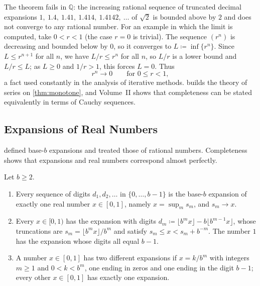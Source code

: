 The theorem fails in $\mathbb Q$: the increasing rational sequence of truncated decimal expansions $1,\ 1.4,\ 1.41,\ 1.414,\ 1.4142,\ \ldots$ of $\sqrt2$ is bounded above by $2$ and does not converge to any rational number. For an example in which the limit is computed, take $0<r<1$ (the case $r=0$ is trivial). The sequence $(r^n)$ is decreasing and bounded below by $0$, so it converges to $L\coloneqq\inf\{r^n\}$. Since $L\le r^{n+1}$ for all $n$, we have $L/r\le r^n$ for all $n$, so $L/r$ is a lower bound and $L/r\le L$; as $L\ge0$ and $1/r>1$, this forces $L=0$. Thus
\begin{equation}
r^n\to0\qquad\text{for }0\le r<1,
\label{eq:rn-zero}
\end{equation}
a fact used constantly in the analysis of iterative methods.  builds the theory of series on \cref{thm:monotone}, and Volume~II shows that completeness can be stated equivalently in terms of Cauchy sequences.

\subsection{Expansions of Real Numbers}

 defined base-$b$ expansions and treated those of rational numbers. Completeness shows that expansions and real numbers correspond almost perfectly.

\begin{theorem}
\label{thm:real-expansion}
Let $b\ge2$.
\begin{enumerate}
\item Every sequence of digits $d_1,d_2,\ldots$ in $\{0,\ldots,b-1\}$ is the base-$b$ expansion of exactly one real number $x\in[0,1]$, namely $x=\sup_ms_m$, and $s_m\to x$.
\item Every $x\in[0,1)$ has the expansion with digits $d_m\coloneqq\lfloor b^mx\rfloor-b\lfloor b^{m-1}x\rfloor$, whose truncations are $s_m=\lfloor b^mx\rfloor/b^m$ and satisfy $s_m\le x<s_m+b^{-m}$. The number $1$ has the expansion whose digits all equal $b-1$.
\item A number $x\in[0,1]$ has two different expansions if $x=k/b^m$ with integers $m\ge1$ and $0<k<b^m$, one ending in zeros and one ending in the digit $b-1$; every other $x\in[0,1]$ has exactly one expansion.
\end{enumerate}
\end{theorem}

